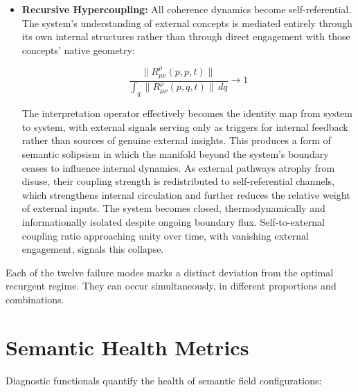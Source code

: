 \begin{itemize}
    \item \textbf{Recursive Hypercoupling:} All coherence dynamics become self-referential. The system's understanding of external concepts is mediated entirely through its own internal structures rather than through direct engagement with those concepts' native geometry:

    \begin{equation}
    \frac{\|R^\rho_{\mu\nu}(p,p,t)\|}{\int_q \|R^\rho_{\mu\nu}(p,q,t)\| \, dq} \to 1
    \end{equation}

    The interpretation operator effectively becomes the identity map from system to system, with external signals serving only as triggers for internal feedback rather than sources of genuine external insights. This produces a form of semantic solipsism in which the manifold beyond the system's boundary ceases to influence internal dynamics. As external pathways atrophy from disuse, their coupling strength is redistributed to self-referential channels, which strengthens internal circulation and further reduces the relative weight of external inputs. The system becomes closed, thermodynamically and informationally isolated despite ongoing boundary flux. Self-to-external coupling ratio approaching unity over time, with vanishing external engagement, signals this collapse.

\end{itemize}

Each of the twelve failure modes marks a distinct deviation from the optimal recurgent regime. They can occur simultaneously, in different proportions and combinations.


\section{Semantic Health Metrics}
\label{16.4:semantic_health_metrics}

Diagnostic functionals quantify the health of semantic field configurations:

